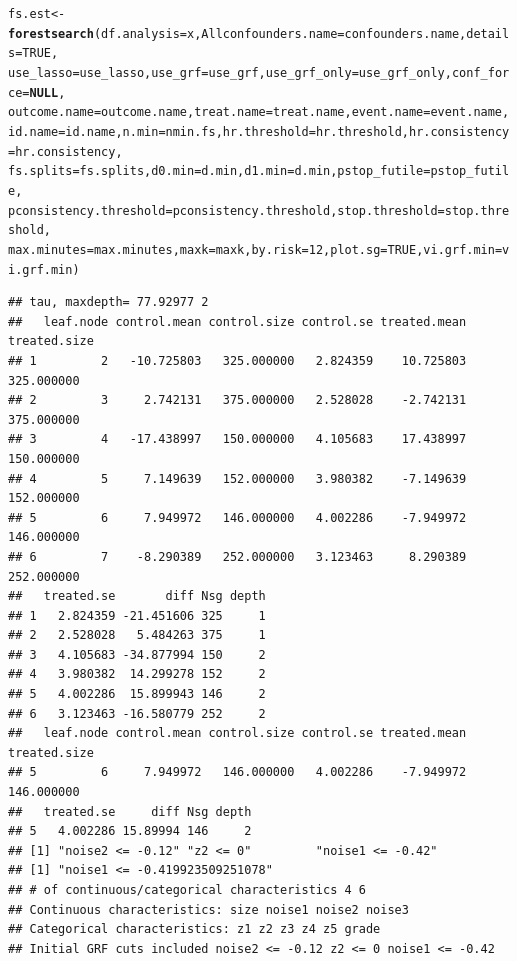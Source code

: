 \documentclass[smallextended]{svjour3}
\makeatletter
\newcommand{\hlnum}[1]{\textcolor[rgb]{0.686,0.059,0.569}{#1}}%
\newcommand{\hlstd}[1]{\textcolor[rgb]{0.345,0.345,0.345}{#1}}%
\newcommand{\hlkwa}[1]{\textcolor[rgb]{0.161,0.373,0.58}{\textbf{#1}}}%
\newcommand{\hlkwb}[1]{\textcolor[rgb]{0.69,0.353,0.396}{#1}}%
\newcommand{\hlkwc}[1]{\textcolor[rgb]{0.333,0.667,0.333}{#1}}%
\newcommand{\hlkwd}[1]{\textcolor[rgb]{0.737,0.353,0.396}{\textbf{#1}}}%
\newenvironment{kframe}{%
 \def\at@end@of@kframe{}%
 \ifinner\ifhmode%
  \def\at@end@of@kframe{\end{minipage}}%
  \begin{minipage}{\columnwidth}%
 \fi\fi%
 \def\FrameCommand##1{\hskip\@totalleftmargin \hskip-\fboxsep
 \colorbox{shadecolor}{##1}\hskip-\fboxsep
     \hskip-\linewidth \hskip-\@totalleftmargin \hskip\columnwidth}%
 \MakeFramed {\advance\hsize-\width
   \@totalleftmargin\z@ \linewidth\hsize
   \@setminipage}}%
 {\par\unskip\endMakeFramed%
 \at@end@of@kframe}
\newenvironment{knitrout}{}{} %
\makeatother
\begin{document}
\begin{knitrout}
\begin{kframe}
\begin{alltt}
\hlstd{fs.est} \hlkwb{<-} \hlkwd{forestsearch}\hlstd{(}\hlkwc{df.analysis} \hlstd{= x,} \hlkwc{Allconfounders.name} \hlstd{= confounders.name,} \hlkwc{details} \hlstd{=} \hlnum{TRUE}\hlstd{,}
    \hlkwc{use_lasso} \hlstd{= use_lasso,} \hlkwc{use_grf} \hlstd{= use_grf,} \hlkwc{use_grf_only} \hlstd{= use_grf_only,} \hlkwc{conf_force} \hlstd{=} \hlkwa{NULL}\hlstd{,}
    \hlkwc{outcome.name} \hlstd{= outcome.name,} \hlkwc{treat.name} \hlstd{= treat.name,} \hlkwc{event.name} \hlstd{= event.name,}
    \hlkwc{id.name} \hlstd{= id.name,} \hlkwc{n.min} \hlstd{= nmin.fs,} \hlkwc{hr.threshold} \hlstd{= hr.threshold,} \hlkwc{hr.consistency} \hlstd{= hr.consistency,}
    \hlkwc{fs.splits} \hlstd{= fs.splits,} \hlkwc{d0.min} \hlstd{= d.min,} \hlkwc{d1.min} \hlstd{= d.min,} \hlkwc{pstop_futile} \hlstd{= pstop_futile,}
    \hlkwc{pconsistency.threshold} \hlstd{= pconsistency.threshold,} \hlkwc{stop.threshold} \hlstd{= stop.threshold,}
    \hlkwc{max.minutes} \hlstd{= max.minutes,} \hlkwc{maxk} \hlstd{= maxk,} \hlkwc{by.risk} \hlstd{=} \hlnum{12}\hlstd{,} \hlkwc{plot.sg} \hlstd{=} \hlnum{TRUE}\hlstd{,} \hlkwc{vi.grf.min} \hlstd{= vi.grf.min)}
\end{alltt}
\begin{verbatim}
## tau, maxdepth= 77.92977 2 
##   leaf.node control.mean control.size control.se treated.mean treated.size
## 1         2   -10.725803   325.000000   2.824359    10.725803   325.000000
## 2         3     2.742131   375.000000   2.528028    -2.742131   375.000000
## 3         4   -17.438997   150.000000   4.105683    17.438997   150.000000
## 4         5     7.149639   152.000000   3.980382    -7.149639   152.000000
## 5         6     7.949972   146.000000   4.002286    -7.949972   146.000000
## 6         7    -8.290389   252.000000   3.123463     8.290389   252.000000
##   treated.se       diff Nsg depth
## 1   2.824359 -21.451606 325     1
## 2   2.528028   5.484263 375     1
## 3   4.105683 -34.877994 150     2
## 4   3.980382  14.299278 152     2
## 5   4.002286  15.899943 146     2
## 6   3.123463 -16.580779 252     2
##   leaf.node control.mean control.size control.se treated.mean treated.size
## 5         6     7.949972   146.000000   4.002286    -7.949972   146.000000
##   treated.se     diff Nsg depth
## 5   4.002286 15.89994 146     2
## [1] "noise2 <= -0.12" "z2 <= 0"         "noise1 <= -0.42"
## [1] "noise1 <= -0.419923509251078"
## # of continuous/categorical characteristics 4 6 
## Continuous characteristics: size noise1 noise2 noise3 
## Categorical characteristics: z1 z2 z3 z4 z5 grade 
## Initial GRF cuts included noise2 <= -0.12 z2 <= 0 noise1 <= -0.42 

\end{verbatim}
\end{kframe}
\end{knitrout}
\end{document}

